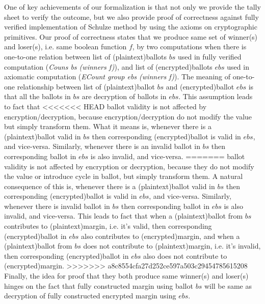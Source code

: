 \documentclass{llncs}
\begin{document}
One of key achievements of our formalization is that
not only we provide the tally sheet  
to verify the outcome, but we also provide 
proof of correctness against fully verified implementation of 
Schulze method\cite{Pattinson:2017:SVE} by using the 
axioms on cryptographic primitives. Our proof of correctness
states that we produce same set of winner(s) and loser(s), i.e. same boolean 
function $f$, by two computations 
when there is one-to-one relation between list of (plaintext)ballots 
$bs$ used  in fully verified computation 
(\textit{Couns bs (winners f)})\cite{Pattinson:2017:SVE}, 
and list of (encrypted)ballots $ebs$ used in axiomatic computation 
(\textit{ECount group ebs (winners f)}). 
The meaning of 
one-to-one relationship between list of (plaintext)ballot $bs$ and
(encrypted)ballot $ebs$ is that all the ballots in $bs$ are decryption
of ballots in $ebs$. This assumption leads to fact that
<<<<<<< HEAD
ballot validity is not affected by encryption/decryption, because 
encryption/decryption do not modify the value %
but simply transform them. What it means is, whenever there is a (plaintext)ballot valid in 
$bs$ then corresponding (encrypted)ballot is valid in $ebs$, and vice-versa.
Similarly, whenever there is an invalid ballot in $bs$ then 
corresponding ballot in $ebs$ is also invalid, and vice-versa.
=======
ballot validity is not affected by encryption or decryption, because 
they do not modify the value or introduce 
cycle in ballot, but simply transform them. 
A natural consequence of this is, whenever there is a 
(plaintext)ballot valid in 
$bs$ then corresponding (encrypted)ballot is valid in $ebs$, and vice-versa.
Similarly, whenever there is invalid ballot in $bs$ then 
corresponding ballot in $ebs$ is also invalid, and vice-versa. This 
leads to fact that when a (plaintext)ballot from $bs$ contributes to
(plaintext)margin, i.e. it's valid, then corresponding 
(encrypted)ballot in $ebs$ also contributes to (encrypted)margin, and 
when a (plaintext)ballot from $bs$ does not contribute to
(plaintext)margin, i.e. it's invalid, then corresponding 
(encrypted)ballot in $ebs$ also does not contribute to (encrypted)margin.
>>>>>>> a8c8554cfa27d252ce597a503c29454785615208
Finally, the idea for proof that they both produce same winner(s) and 
loser(s) hinges on the 
fact that fully constructed margin using ballot $bs$ will be same as 
decryption of fully constructed encrypted margin using $ebs$. 
%
\end{document}

